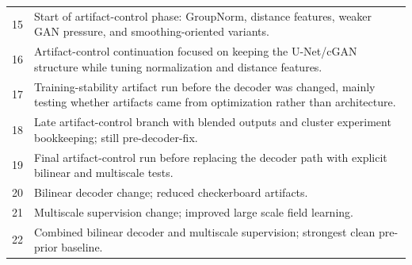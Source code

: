 \begin{table}[H]
\begin{tabularx}{\textwidth}{p{}>{\raggedright\arraybackslash}X}
15 & Start of artifact-control phase: GroupNorm, distance features, weaker GAN pressure, and smoothing-oriented variants. \\
16 & Artifact-control continuation focused on keeping the U-Net/cGAN structure while tuning normalization and distance features. \\
17 & Training-stability artifact run before the decoder was changed, mainly testing whether artifacts came from optimization rather than architecture. \\
18 & Late artifact-control branch with blended outputs and cluster experiment bookkeeping; still pre-decoder-fix. \\
19 & Final artifact-control run before replacing the decoder path with explicit bilinear and multiscale tests. \\
20 & Bilinear decoder change; reduced checkerboard artifacts. \\
21 & Multiscale supervision change; improved large scale field learning. \\
22 & Combined bilinear decoder and multiscale supervision; strongest clean pre-prior baseline. \\
\bottomrule
\end{tabularx}
\end{table}
\small

